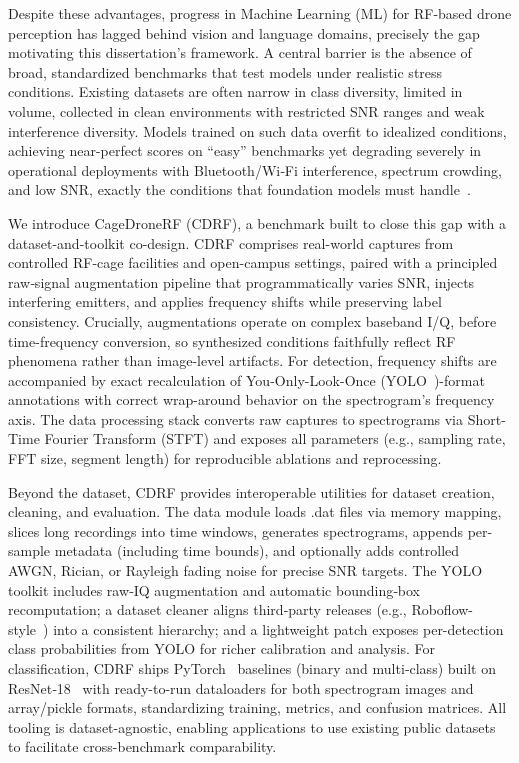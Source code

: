 Despite these advantages, progress in Machine Learning (ML) for RF-based drone perception has lagged behind vision and language domains, precisely the gap motivating this dissertation's framework. A central barrier is the absence of broad, standardized benchmarks that test models under realistic stress conditions. Existing datasets are often narrow in class diversity, limited in volume, collected in clean environments with restricted SNR ranges and weak interference diversity. Models trained on such data overfit to idealized conditions, achieving near-perfect scores on ``easy'' benchmarks yet degrading severely in operational deployments with Bluetooth/Wi‑Fi interference, spectrum crowding, and low SNR, exactly the conditions that foundation models must handle~\cite{rfuav}.

We introduce CageDroneRF (CDRF), a benchmark built to close this gap with a dataset-and-toolkit co-design. CDRF comprises real-world captures from controlled RF-cage facilities and open-campus settings, paired with a principled raw‑signal augmentation pipeline that programmatically varies SNR, injects interfering emitters, and applies frequency shifts while preserving label consistency. Crucially, augmentations operate on complex baseband I/Q, before time-frequency conversion, so synthesized conditions faithfully reflect RF phenomena rather than image-level artifacts. For detection, frequency shifts are accompanied by exact recalculation of You-Only-Look-Once (YOLO~\cite{redmon2016you})-format annotations with correct wrap-around behavior on the spectrogram’s frequency axis. The data processing stack converts raw captures to spectrograms via Short-Time Fourier Transform (STFT) and exposes all parameters (e.g., sampling rate, FFT size, segment length) for reproducible ablations and reprocessing.

Beyond the dataset, CDRF provides interoperable utilities for dataset creation, cleaning, and evaluation. The data module loads .dat files via memory mapping, slices long recordings into time windows, generates spectrograms, appends per-sample metadata (including time bounds), and optionally adds controlled AWGN, Rician, or Rayleigh fading noise for precise SNR targets. The YOLO toolkit includes raw‑IQ augmentation and automatic bounding‑box recomputation; a dataset cleaner aligns third‑party releases (e.g., Roboflow-style~\cite{roboflow_website}) into a consistent hierarchy; and a lightweight patch exposes per-detection class probabilities from YOLO for richer calibration and analysis. For classification, CDRF ships PyTorch~\cite{paszke2019pytorch} baselines (binary and multi‑class) built on ResNet‑18~\cite{he2016deep} with ready-to-run dataloaders for both spectrogram images and array/pickle formats, standardizing training, metrics, and confusion matrices. All tooling is dataset-agnostic, enabling applications to use existing public datasets to facilitate cross-benchmark comparability.

